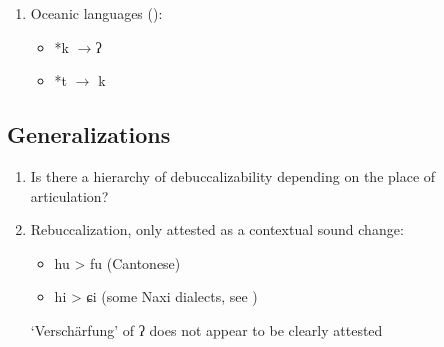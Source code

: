 \documentclass[oldfontcommands,oneside,a4paper,11pt]{article}
\newcommand{\ipa}[1]{{\phon \mbox{#1}}} %
\begin{document}
\begin{enumerate}
\begin{enumerate}
\item Oceanic languages (\citealt{blust04tk}):
 
 \begin{itemize}
\item \ipa{*k} $\rightarrow $\ipa{ʔ}
\item \ipa{*t} $\rightarrow$ \ipa{k}  
\end{itemize} 
 \end{enumerate}
 \end{enumerate}
 
 

 
  \subsection{Generalizations}
 \begin{enumerate}
\item Is there a hierarchy of debuccalizability depending on the place of articulation? %

\item  Rebuccalization, only attested as a contextual sound change:
 \begin{itemize}
\item hu > fu (Cantonese)
\item hi > ɕi (some Naxi dialects, see \citealt{michaud06neutralisation})
 \end{itemize}
`Verschärfung' of ʔ does not appear to be clearly attested
 \end{enumerate}


\end{document}
